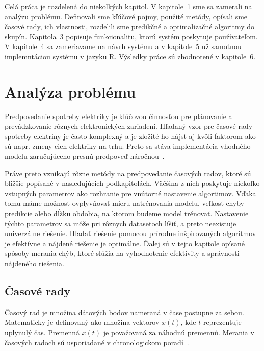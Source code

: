 \documentclass[a4paper,slovak,12pt,appendix]{article}
\begin{document}
Celá práca je rozdelená do niekoľkých kapitol. V
kapitole~\ref{problem-analysis} sme sa zamerali na analýzu problému. Definovali
sme kľúčové pojmy, použité metódy, opísali sme časové rady, ich vlastnosti,
rozdelili sme predikčné a optimalizačné algoritmy do skupín.
Kapitola~3 popisuje funkcionalitu, ktorú systém poskytuje                       %
používateľom. V kapitole~4 sa zameriavame na návrh systému                      %
a v kapitole~5 už samotnou implemntáciou systému v jazyku R.                    %
Výsledky práce sú zhodnotené v kapitole~6.                                      %


\newpage
\section{Analýza problému}
\label{problem-analysis}
Predpovedanie spotreby elektriky je kľúčovou činnosťou pre plánovanie
a prevádzkovanie rôznych elektronických zariadení. Hľadaný vzor pre časové
rady spotreby elektriny je často komplexný a je zložité ho nájsť aj kvôli
faktorom ako sú napr. zmeny cien elektriky na trhu. Preto sa stáva
implementácia vhodného modelu zaručujúceho presnú predpoveď
náročnou~\cite{Mahalakshmi2016}.

Práve preto vznikajú rôzne metódy na predpovedanie časových radov, ktoré sú
bližšie popísané v nasledujúcich podkapitolách. Väčšina z nich poskytuje
niekoľko vstupných parametrov ako rozhranie pre vnútorné nastavenie algortimov.
Vďaka tomu máme možnosť ovplyvňovať mieru natrénovania modelu, veľkosť chyby
predikcie alebo dĺžku obdobia, na ktorom budeme model trénovať. Nastavenie
týchto parametrov sa môže pri rôznych datasetoch líšiť, a preto neexistuje
univerzálne riešenie. Hľadať riešenie pomocou prírodne inšpirovaných
algoritmov je efektívne a nájdené riešenie je optimálne. Ďalej sú v tejto
kapitole opísané spôsoby merania chýb, ktoré slúžia na vyhodnotenie efektivity
a správnosti nájdeného riešenia.


\subsection{Časové rady}
Časový rad je množina dátových bodov nameraná v čase postupne za sebou.
Matematicky je definovaný ako množina vektorov $x(t)$, kde $t$ reprezentuje
uplynulý čas. Premenná $x(t)$ je považovaná za náhodnú premennú.
Merania v časových radoch sú usporiadané v chronologickom
poradí~\cite{Agrawal2013}.
\end{document}
